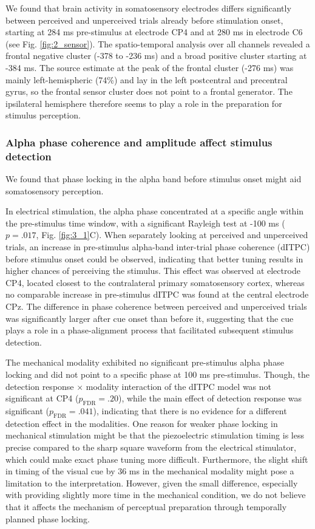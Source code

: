 \documentclass[11pt,a4paper,onecolumn]{article}
\begin{document}
We found that brain activity in somatosensory electrodes differs significantly between perceived and unperceived trials already before stimulation onset, starting at 284 ms pre-stimulus at electrode CP4 and at 280 ms in electrode C6 (see Fig. \ref{fig:2_sensor}). The spatio-temporal analysis over all channels revealed a frontal negative cluster (-378 to -236 ms) and a broad positive cluster starting at -384 ms. The source estimate at the peak of the frontal cluster (-276 ms) was mainly left-hemispheric (74\%) and lay in the left postcentral and precentral gyrus, so the frontal sensor cluster does not point to a frontal generator. The ipsilateral hemisphere therefore seems to play a role in the preparation for stimulus perception.

\subsubsection*{Alpha phase coherence and amplitude affect stimulus detection}
We found that phase locking in the alpha band before stimulus onset might aid somatosensory perception. 

In electrical stimulation, the alpha phase concentrated at a specific angle within the pre-stimulus time window, with a significant Rayleigh test at -100 ms ($p = .017$, Fig. \ref{fig:3_1}C). 
When separately looking at perceived and unperceived trials, an increase in pre-stimulus alpha-band inter-trial phase coherence (dITPC) before stimulus onset could be observed, indicating that better tuning results in higher chances of perceiving the stimulus. 
This effect was observed at electrode CP4, located closest to the contralateral primary somatosensory cortex, whereas no comparable increase in pre-stimulus dITPC was found at the central electrode CPz. 
The difference in phase coherence between perceived and unperceived trials was significantly larger after cue onset than before it, suggesting that the cue plays a role in a phase-alignment process that facilitated subsequent stimulus detection. 

The mechanical modality exhibited no significant pre-stimulus alpha phase locking and did not point to a specific phase at 100 ms pre-stimulus. Though, the detection response $\times$ modality interaction of the dITPC model was not significant at CP4 ($p_\mathrm{FDR} = .20$), while the main effect of detection response was significant ($p_\mathrm{FDR} = .041$), indicating that there is no evidence for a different detection effect in the modalities. One reason for weaker phase locking in mechanical stimulation might be that the piezoelectric stimulation timing is less precise compared to the sharp square waveform from the electrical stimulator, which could make exact phase tuning more difficult. Furthermore, the slight shift in timing of the visual cue by 36 ms in the mechanical modality might pose a limitation to the interpretation. However, given the small difference, especially with providing slightly more time in the mechanical condition, we do not believe that it affects the mechanism of perceptual preparation through temporally planned phase locking.
\end{document}
